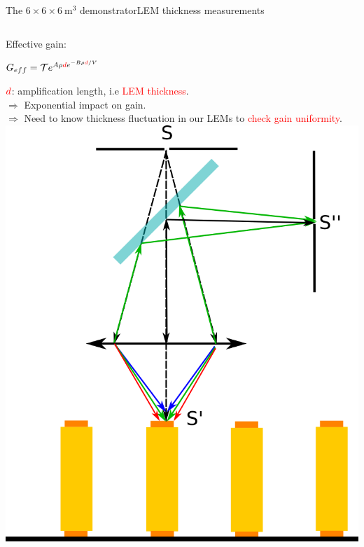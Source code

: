 \documentclass[10pt]{beamer}
\begin{document}
    \begin{frame}{The \texorpdfstring{$6 \times 6 \times \SI{6}{\meter\cubed}$}{666} demonstrator}{LEM thickness measurements}
    	\begin{scriptsize}
    		\begin{columns}
    			\begin{column}{0.48\textwidth}
    				Effective gain:\\
    				\begin{center}
	    				$G _{eff}= \mathcal{T}e^{A\rho \textcolor{red}{d} e^{-B\rho \textcolor{red}{d}/V}}$\\
    				\end{center}
    				$\textcolor{red}{d}$: amplification length, i.e \textcolor{red}{LEM thickness}.\\
    				$\Rightarrow$ Exponential impact on gain.\\
    				$\Rightarrow$ Need to know thickness fluctuation in our LEMs to \textcolor{red}{check gain uniformity}.\\
    				\vfill
    				\centering \includegraphics[height=0.5\textheight]{figures/666/CCI.png}\\\vfill

\end{column}
\end{columns}
\end{scriptsize}
\end{frame}
\end{document}

